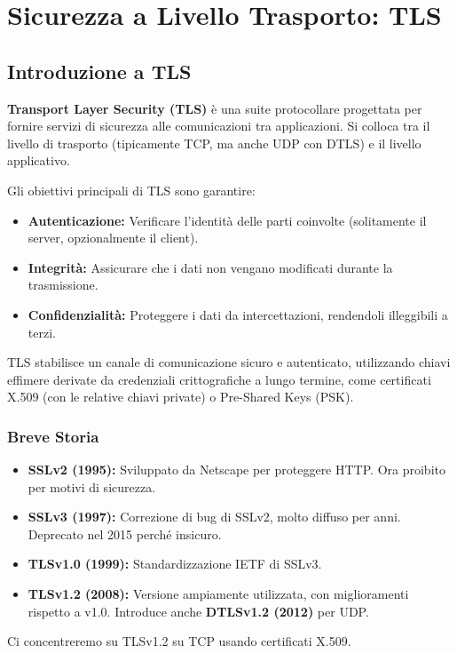 \documentclass[../main.tex]{subfiles}
\begin{document}
\section{Sicurezza a Livello Trasporto: TLS}
\label{sec:tls}

\subsection{Introduzione a TLS}
\textbf{Transport Layer Security (TLS)} è una suite protocollare progettata per fornire servizi di sicurezza alle comunicazioni tra applicazioni. Si colloca tra il livello di trasporto (tipicamente TCP, ma anche UDP con DTLS) e il livello applicativo.

Gli obiettivi principali di TLS sono garantire:
\begin{itemize}
    \item \textbf{Autenticazione:} Verificare l'identità delle parti coinvolte (solitamente il server, opzionalmente il client).
    \item \textbf{Integrità:} Assicurare che i dati non vengano modificati durante la trasmissione.
    \item \textbf{Confidenzialità:} Proteggere i dati da intercettazioni, rendendoli illeggibili a terzi.
\end{itemize}
TLS stabilisce un canale di comunicazione sicuro e autenticato, utilizzando chiavi effimere derivate da credenziali crittografiche a lungo termine, come certificati X.509 (con le relative chiavi private) o Pre-Shared Keys (PSK).

\subsubsection{Breve Storia}
\begin{itemize}
    \item \textbf{SSLv2 (1995):} Sviluppato da Netscape per proteggere HTTP. Ora proibito per motivi di sicurezza.
    \item \textbf{SSLv3 (1997):} Correzione di bug di SSLv2, molto diffuso per anni. Deprecato nel 2015 perché insicuro.
    \item \textbf{TLSv1.0 (1999):} Standardizzazione IETF di SSLv3.
    \item \textbf{TLSv1.2 (2008):} Versione ampiamente utilizzata, con miglioramenti rispetto a v1.0. Introduce anche \textbf{DTLSv1.2 (2012)} per UDP.
\end{itemize}
Ci concentreremo su TLSv1.2 su TCP usando certificati X.509.
\end{document}
